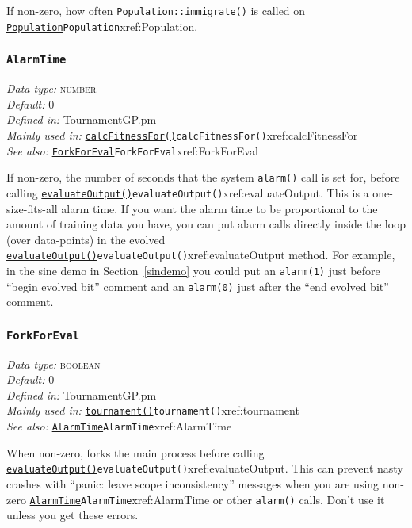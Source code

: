 \documentclass[a4paper]{article}
\begin{document}
If non-zero, how often \texttt{Population::immigrate()}
is called on \hyperref[no]{\texttt{Population}}{\texttt{Population}}{xref:Population}.

\subsubsection{\texttt{AlarmTime}}\label{xref:AlarmTime}
\begin{flushleft}
\textit{Data type:} \textsc{number}\\
\textit{Default:} 0\\
\textit{Defined in:} TournamentGP.pm\\
\textit{Mainly used in:} \hyperref[no]{\texttt{calcFitnessFor()}}{\texttt{calcFitnessFor()}}{xref:calcFitnessFor}\\
\textit{See also:} \hyperref[no]{\texttt{ForkForEval}}{\texttt{ForkForEval}}{xref:ForkForEval}
\end{flushleft}

If non-zero, the number of seconds that the system \texttt{alarm()}
call is set for, before calling \hyperref[no]{\texttt{evaluateOutput()}}{\texttt{evaluateOutput()}}{xref:evaluateOutput}.  This is a
one-size-fits-all alarm time.  If you want the alarm time to be
proportional to the amount of training data you have, you can put
alarm calls directly inside the loop (over data-points) in the evolved
\hyperref[no]{\texttt{evaluateOutput()}}{\texttt{evaluateOutput()}}{xref:evaluateOutput} method.  For example, in the sine demo in
Section~\ref{sindemo} you could put an \texttt{alarm(1)} just before
``begin evolved bit'' comment and an \texttt{alarm(0)}
just after the ``end evolved bit'' comment.

\subsubsection{\texttt{ForkForEval}}\label{xref:ForkForEval}
\begin{flushleft}
\textit{Data type:} \textsc{boolean}\\
\textit{Default:} 0\\
\textit{Defined in:} TournamentGP.pm\\
\textit{Mainly used in:} \hyperref[no]{\texttt{tournament()}}{\texttt{tournament()}}{xref:tournament}\\
\textit{See also:} \hyperref[no]{\texttt{AlarmTime}}{\texttt{AlarmTime}}{xref:AlarmTime}
\end{flushleft}

When non-zero, forks the main process before calling
\hyperref[no]{\texttt{evaluateOutput()}}{\texttt{evaluateOutput()}}{xref:evaluateOutput}.  This can prevent nasty crashes with
``panic: leave scope inconsistency'' messages when you are using
non-zero \hyperref[no]{\texttt{AlarmTime}}{\texttt{AlarmTime}}{xref:AlarmTime} or other \texttt{alarm()} calls.  Don't
use it unless you get these errors.
\end{document}
